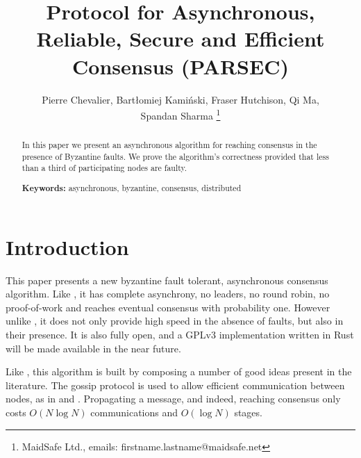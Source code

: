 \documentclass[a4paper,fleqn]{article}
\begin{document}

\renewcommand{\topfraction}{0.85}
\renewcommand{\textfraction}{0.1}
\renewcommand{\floatpagefraction}{0.75}
\setlength\parindent{0.5cm}
\setcounter{tocdepth}{3}

\theoremstyle{definition}
\newtheorem{defn}{Definition}[section]
\theoremstyle{plain}
\newtheorem{thm}{Theorem}[section]
\newtheorem{lem}[thm]{Lemma}

\title{Protocol for Asynchronous, Reliable, Secure and Efficient Consensus (PARSEC)}

\author{Pierre Chevalier, Bartłomiej Kamiński, Fraser Hutchison, Qi Ma, \\
Spandan Sharma
\thanks{MaidSafe Ltd., emails: firstname.lastname@maidsafe.net}}%

\maketitle


\begin{abstract}
	In this paper we present an asynchronous algorithm for reaching consensus in the presence of
	Byzantine faults. We prove the algorithm's correctness provided that less than a third of
	participating nodes are faulty.

	\textbf{Keywords:} asynchronous, byzantine, consensus, distributed
\end{abstract}


\section{Introduction}

This paper presents a new byzantine fault tolerant, asynchronous consensus algorithm. Like
\cite{hg}, it has complete asynchrony, no leaders, no round robin, no proof-of-work and reaches
eventual consensus with probability one. However unlike \cite {hg}, it does not only provide high
speed in the absence of faults, but also in their presence. It is also fully open, and a GPLv3
implementation written in Rust will be made available in the near future.

Like \cite{hbbft}, this algorithm is built by composing a number of good ideas present in the
literature. The gossip protocol is used to allow efficient communication between nodes, as in
\cite{hg} and \cite{snowflake}. Propagating a message, and indeed, reaching consensus only
costs $O(N\log{N})$ communications and $O(\log{N})$ stages.
\end{document}
